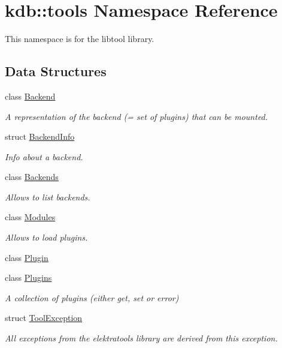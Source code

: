\hypertarget{namespacekdb_1_1tools}{\section{kdb\-:\-:tools Namespace Reference}
\label{namespacekdb_1_1tools}
}


This namespace is for the libtool library.  


\subsection*{Data Structures}
\begin{DoxyCompactItemize}
\item 
class \hyperlink{classkdb_1_1tools_1_1Backend}{Backend}
\begin{DoxyCompactList}\small\item\em A representation of the backend (= set of plugins) that can be mounted. \end{DoxyCompactList}\item 
struct \hyperlink{structkdb_1_1tools_1_1BackendInfo}{Backend\-Info}
\begin{DoxyCompactList}\small\item\em Info about a backend. \end{DoxyCompactList}\item 
class \hyperlink{classkdb_1_1tools_1_1Backends}{Backends}
\begin{DoxyCompactList}\small\item\em Allows to list backends. \end{DoxyCompactList}\item 
class \hyperlink{classkdb_1_1tools_1_1Modules}{Modules}
\begin{DoxyCompactList}\small\item\em Allows to load plugins. \end{DoxyCompactList}\item 
class \hyperlink{classkdb_1_1tools_1_1Plugin}{Plugin}
\item 
class \hyperlink{classkdb_1_1tools_1_1Plugins}{Plugins}
\begin{DoxyCompactList}\small\item\em A collection of plugins (either get, set or error) \end{DoxyCompactList}\item 
struct \hyperlink{structkdb_1_1tools_1_1ToolException}{Tool\-Exception}
\begin{DoxyCompactList}\small\item\em All exceptions from the elektratools library are derived from this exception. \end{DoxyCompactList}\end{DoxyCompactItemize}


